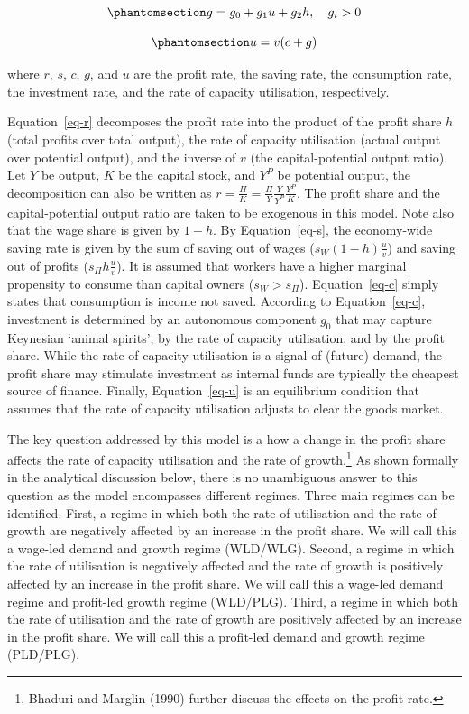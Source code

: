 \documentclass[
  letterpaper,
  DIV=11,
  numbers=noendperiod]{scrreprt}
\begin{document}
\begin{equation}\phantomsection\label{eq-g}{
g=g_0+g_1u+g_2h, \quad g_i > 0
}\end{equation}

\begin{equation}\phantomsection\label{eq-u}{
u=v(c+g)
}\end{equation}

where \(r\), \(s\), \(c\), \(g\), and \(u\) are the profit rate, the
saving rate, the consumption rate, the investment rate, and the rate of
capacity utilisation, respectively.

Equation~\ref{eq-r} decomposes the profit rate into the product of the
profit share \(h\) (total profits over total output), the rate of
capacity utilisation (actual output over potential output), and the
inverse of \(v\) (the capital-potential output ratio). Let \(Y\) be
output, \(K\) be the capital stock, and \(Y^P\) be potential output, the
decomposition can also be written as
\(r=\frac{\Pi}{K}=\frac{\Pi}{Y}\frac{Y}{Y^P}\frac{Y^P}{K}\). The profit
share and the capital-potential output ratio are taken to be exogenous
in this model. Note also that the wage share is given by \(1-h\). By
Equation~\ref{eq-s}, the economy-wide saving rate is given by the sum of
saving out of wages (\(s_W(1-h)\frac{u}{v}\)) and saving out of profits
(\(s_\Pi h\frac{u}{v}\)). It is assumed that workers have a higher
marginal propensity to consume than capital owners (\(s_W>s_\Pi\)).
Equation~\ref{eq-c} simply states that consumption is income not saved.
According to Equation~\ref{eq-c}, investment is determined by an
autonomous component \(g_0\) that may capture Keynesian `animal
spirits', by the rate of capacity utilisation, and by the profit share.
While the rate of capacity utilisation is a signal of (future) demand,
the profit share may stimulate investment as internal funds are
typically the cheapest source of finance. Finally, Equation~\ref{eq-u}
is an equilibrium condition that assumes that the rate of capacity
utilisation adjusts to clear the goods market.

The key question addressed by this model is a how a change in the profit
share affects the rate of capacity utilisation and the rate of
growth.\footnote{Bhaduri and Marglin (1990) further discuss the effects
  on the profit rate.} As shown formally in the analytical discussion
below, there is no unambiguous answer to this question as the model
encompasses different regimes. Three main regimes can be identified.
First, a regime in which both the rate of utilisation and the rate of
growth are negatively affected by an increase in the profit share. We
will call this a wage-led demand and growth regime (WLD/WLG). Second, a
regime in which the rate of utilisation is negatively affected and the
rate of growth is positively affected by an increase in the profit
share. We will call this a wage-led demand regime and profit-led growth
regime (WLD/PLG). Third, a regime in which both the rate of utilisation
and the rate of growth are positively affected by an increase in the
profit share. We will call this a profit-led demand and growth regime
(PLD/PLG).
\end{document}
